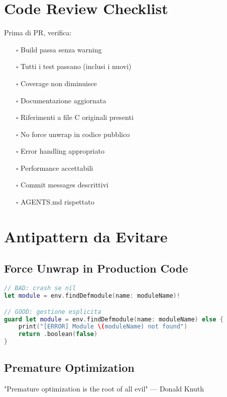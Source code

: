 \section{Code Review Checklist}

Prima di PR, verifica:

\begin{itemize}
\item[$\square$] Build passa senza warning
\item[$\square$] Tutti i test passano (inclusi i nuovi)
\item[$\square$] Coverage non diminuisce
\item[$\square$] Documentazione aggiornata
\item[$\square$] Riferimenti a file C originali presenti
\item[$\square$] No force unwrap in codice pubblico
\item[$\square$] Error handling appropriato
\item[$\square$] Performance accettabili
\item[$\square$] Commit messages descrittivi
\item[$\square$] AGENTS.md rispettato
\end{itemize}

\section{Antipattern da Evitare}

\subsection{Force Unwrap in Production Code}

\begin{lstlisting}[language=Swift]
// BAD: crash se nil
let module = env.findDefmodule(name: moduleName)!

// GOOD: gestione esplicita
guard let module = env.findDefmodule(name: moduleName) else {
    print("[ERROR] Module \(moduleName) not found")
    return .boolean(false)
}
\end{lstlisting}

\subsection{Premature Optimization}

\begin{warningbox}
"Premature optimization is the root of all evil" --- Donald Knuth
\end{warningbox}

